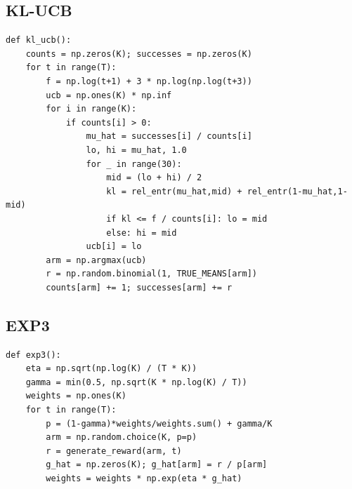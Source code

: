 \documentclass[UTF8,a4paper,11pt,zihao=5]{ctexart}
\begin{document}
\subsection*{KL-UCB}

\begin{verbatim}
def kl_ucb():
    counts = np.zeros(K); successes = np.zeros(K)
    for t in range(T):
        f = np.log(t+1) + 3 * np.log(np.log(t+3))
        ucb = np.ones(K) * np.inf
        for i in range(K):
            if counts[i] > 0:
                mu_hat = successes[i] / counts[i]
                lo, hi = mu_hat, 1.0
                for _ in range(30):
                    mid = (lo + hi) / 2
                    kl = rel_entr(mu_hat,mid) + rel_entr(1-mu_hat,1-mid)
                    if kl <= f / counts[i]: lo = mid
                    else: hi = mid
                ucb[i] = lo
        arm = np.argmax(ucb)
        r = np.random.binomial(1, TRUE_MEANS[arm])
        counts[arm] += 1; successes[arm] += r
\end{verbatim}

\subsection*{EXP3}

\begin{verbatim}
def exp3():
    eta = np.sqrt(np.log(K) / (T * K))
    gamma = min(0.5, np.sqrt(K * np.log(K) / T))
    weights = np.ones(K)
    for t in range(T):
        p = (1-gamma)*weights/weights.sum() + gamma/K
        arm = np.random.choice(K, p=p)
        r = generate_reward(arm, t)
        g_hat = np.zeros(K); g_hat[arm] = r / p[arm]
        weights = weights * np.exp(eta * g_hat)
\end{verbatim}
\end{document}
